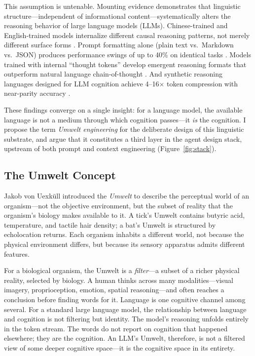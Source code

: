 \documentclass[11pt,a4paper]{article}
\begin{document}
This assumption is untenable. Mounting evidence demonstrates that linguistic structure---independent of informational content---systematically alters the reasoning behavior of large language models (LLMs). Chinese-trained and English-trained models internalize different causal reasoning patterns, not merely different surface forms \citep{wang2025}. Prompt formatting alone (plain text vs.\ Markdown vs.\ JSON) produces performance swings of up to 40\% on identical tasks \citep{he2024}. Models trained with internal ``thought tokens'' develop emergent reasoning formats that outperform natural language chain-of-thought \citep{zelikman2024}. And synthetic reasoning languages designed for LLM cognition achieve 4--16$\times$ token compression with near-parity accuracy \citep{tanmay2025}.

These findings converge on a single insight: for a language model, the available language is not a medium through which cognition passes---it \emph{is} the cognition. I propose the term \emph{Umwelt engineering} for the deliberate design of this linguistic substrate, and argue that it constitutes a third layer in the agent design stack, upstream of both prompt and context engineering (Figure~\ref{fig:stack}).

\subsection{The Umwelt Concept}

Jakob von Uexk\"{u}ll \citeyearpar{uexkull1934} introduced the \emph{Umwelt} to describe the perceptual world of an organism---not the objective environment, but the subset of reality that the organism's biology makes available to it. A tick's Umwelt contains butyric acid, temperature, and tactile hair density; a bat's Umwelt is structured by echolocation returns. Each organism inhabits a different world, not because the physical environment differs, but because its sensory apparatus admits different features.

For a biological organism, the Umwelt is a \emph{filter}---a subset of a richer physical reality, selected by biology. A human thinks across many modalities---visual imagery, proprioception, emotion, spatial reasoning---and often reaches a conclusion before finding words for it. Language is one cognitive channel among several. For a standard large language model, the relationship between language and cognition is not filtering but identity. The model's reasoning unfolds entirely in the token stream. The words do not report on cognition that happened elsewhere; they are the cognition. An LLM's Umwelt, therefore, is not a filtered view of some deeper cognitive space---it is the cognitive space in its entirety.
\end{document}
